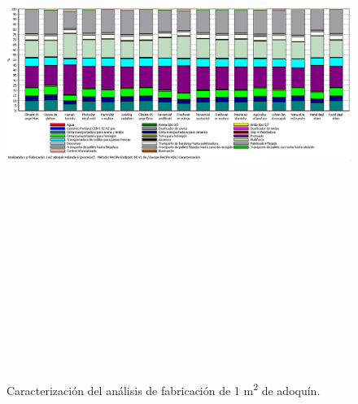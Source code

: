 \begin{figure}[!htb]
\centering
\includegraphics[angle=90,height=19cm]{fabricacion_caracterizacion.png}
\caption{Caracterización del análisis de fabricación de 1 \si{m^2} de adoquín.}
\label{fig:caracterizacionfabricacion}
\end{figure}

